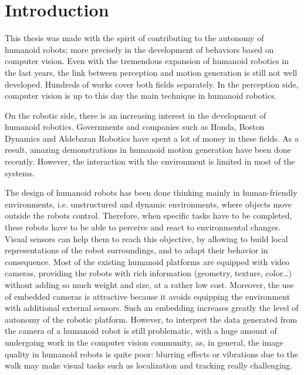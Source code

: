 
\chapter{Introduction} 
\label{Chap:Introduction}

This thesis was made with the spirit of contributing to the autonomy of humanoid robots; more precisely in the development of behaviors based on computer vision. Even with the tremendous expansion of humanoid robotics in the last years, the link between perception and motion generation is still not well developed. Hundreds of works cover both fields separately. In the perception side, computer vision is up to this day the main technique in humanoid robotics. 

On the robotic side, there is an increasing interest in the development of humanoid robotics. Governments and companies such as Honda, Boston Dynamics and Aldebaran Robotics have spent a lot of money in these fields. As a result, amazing demonstrations in humanoid motion generation have been done recently. However, the interaction with the environment is limited in most of the systems.

The design of humanoid robots has been done thinking mainly in human-friendly environments, i.e. unstructured and dynamic environments, where objects move outside the robots control. Therefore, when specific tasks have to be completed, these robots have to be able to perceive and react to environmental changes. Visual sensors can help them to reach this objective, by allowing to build local representations of the robot surroundings, and to adapt their behavior in consequence. Most of the existing humanoid platforms are equipped with video cameras, providing the robots with rich information (geometry, texture, color\dots) without adding so much weight and size, at a rather low cost. Moreover, the use of embedded cameras is attractive because it avoids equipping the environment with additional external sensors. Such an embedding increases greatly the level of autonomy of the robotic platform. However, to interpret the data generated from the camera of a humanoid robot is still problematic, with a huge amount of undergoing work in the computer vision community, as, in general, the image quality in humanoid robots is quite poor: blurring effects or vibrations due to the walk may make visual tasks such as  localization and tracking really challenging. 

